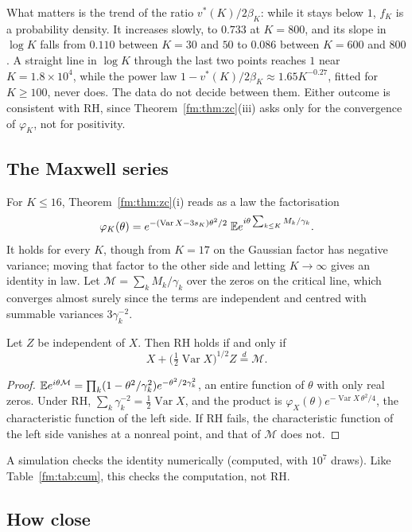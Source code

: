 What matters is the trend of the ratio $v^*(K)/2\beta_K$: while it stays below $1$, $f_K$ is a probability density. It increases slowly, to $0.733$ at $K=800$, and its slope in $\log K$ falls from $0.110$ between $K=30$ and $50$ to $0.086$ between $K=600$ and $800$. A straight line in $\log K$ through the last two points reaches $1$ near $K=1.8\times10^4$, while the power law $1-v^*(K)/2\beta_K\approx1.65K^{-0.27}$, fitted for $K\ge100$, never does. The data do not decide between them. Either outcome is consistent with RH, since Theorem~\ref{fm:thm:zc}(iii) asks only for the convergence of $\varphi_K$, not for positivity.

\subsection{The Maxwell series}\label{fm:sec:maxwell}

For $K\le16$, Theorem~\ref{fm:thm:zc}(i) reads as a law the factorisation
\[
\varphi_K(\theta)=e^{-(\operatorname{Var}X-3s_K)\theta^2/2}\;\mathbb{E} e^{i\theta\sum_{k\le K}M_k/\gamma_k}.
\]
It holds for every $K$, though from $K=17$ on the Gaussian factor has negative variance; moving that factor to the other side and letting $K\to\infty$ gives an identity in law. Let $\mathcal M=\sum_kM_k/\gamma_k$ over the zeros on the critical line, which converges almost surely since the terms are independent and centred with summable variances $3\gamma_k^{-2}$.

\begin{theorem}\label{fm:thm:maxwell}
Let $Z$ be independent of $X$. Then RH holds if and only if
\[
X+\big(\tfrac12\operatorname{Var}X\big)^{1/2}Z\overset d=\mathcal M .
\]
\end{theorem}

\begin{proof}
$\mathbb{E} e^{i\theta\mathcal M}=\prod_k(1-\theta^2/\gamma_k^2)e^{-\theta^2/2\gamma_k^2}$, an entire function of $\theta$ with only real zeros. Under RH, $\sum_k\gamma_k^{-2}=\frac12\operatorname{Var}X$, and the product is $\varphi_X(\theta)e^{-\operatorname{Var}X\,\theta^2/4}$, the characteristic function of the left side. If RH fails, the characteristic function of the left side vanishes at a nonreal point, and that of $\mathcal M$ does not.
\end{proof}

A simulation checks the identity numerically (computed, with $10^7$ draws). Like Table~\ref{fm:tab:cum}, this checks the computation, not RH.

\subsection{How close}\label{fm:sec:compare}


